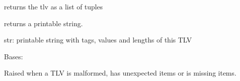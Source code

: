 \documentclass[letterpaper,10pt,english]{sphinxmanual}
\begin{document}
\begin{fulllineitems}
\begin{fulllineitems}
\begin{description}
\end{description}

\end{fulllineitems}


\begin{fulllineitems}
\label{\detokenize{aliro_actuator.access_protocol.tlv:aliro_actuator.access_protocol.tlv.TLV.to_data}}
\pysigstartsignatures
{}
\pysigstopsignatures
\sphinxAtStartPar
returns the tlv as a list of tuples

\end{fulllineitems}


\begin{fulllineitems}
\label{\detokenize{aliro_actuator.access_protocol.tlv:aliro_actuator.access_protocol.tlv.TLV.to_print}}
\pysigstartsignatures
{}
\pysigstopsignatures
\sphinxAtStartPar
returns a printable string.
\begin{description}
\sphinxAtStartPar
str: printable string with tags, values and lengths of this TLV

\end{description}

\end{fulllineitems}


\end{fulllineitems}


\begin{fulllineitems}
\label{\detokenize{aliro_actuator.access_protocol.tlv:aliro_actuator.access_protocol.tlv.TlvError}}
\pysigstartsignatures
{}
\pysigstopsignatures
\sphinxAtStartPar
Bases: {\hyperref[\detokenize{aliro_actuator.access_protocol.errors:aliro_actuator.access_protocol.errors.AccessProtocolError}]{}}

\sphinxAtStartPar
Raised when a TLV is malformed, has unexpected items or is missing items.

\end{fulllineitems}
\end{document}
